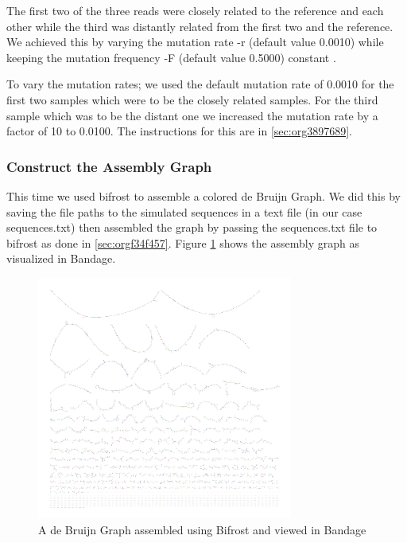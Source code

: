 \documentclass[10pt, a4paper]{article}
\begin{document}
The first two of the three reads were closely related to the reference and each
other while the third was distantly related from the first two and the
reference.
We achieved this by varying the mutation rate -r (default value 0.0010) while 
keeping the mutation frequency -F (default value 0.5000) constant
\cite{greenSuggestionsConcerningRelationship1995}.

To vary the mutation rates; we used the default mutation rate of 0.0010 for
the first two samples which were to be the closely related samples. 
For the third sample which was to be the distant one we increased the mutation 
rate by a factor of 10 to 0.0100. 
The instructions for this are in \ref{sec:org3897689}.

\subsubsection{Construct the Assembly Graph}
\label{sec:org82d42a6}
This time we used bifrost \cite{holleyBifrostHighlyParallel2019} to assemble a
colored de Bruijn Graph. 
We did this by saving the file paths to the simulated sequences in a text file
(in our case sequences.txt) then assembled the graph by passing the 
sequences.txt file to bifrost as done in \ref{sec:orgf34f457}.
Figure \ref{fig:org907246f} shows the assembly graph as visualized in Bandage.

\begin{figure}[h]
\centering
\includegraphics[width=0.75\textwidth]{../Figures/SARS_CoV_2/SARS_Assembly_Graph.png}
\caption[SARS-CoV-2 Assembly Graph]{\label{fig:org907246f}A de Bruijn Graph assembled using Bifrost and viewed in Bandage}
\end{figure}
\end{document}
